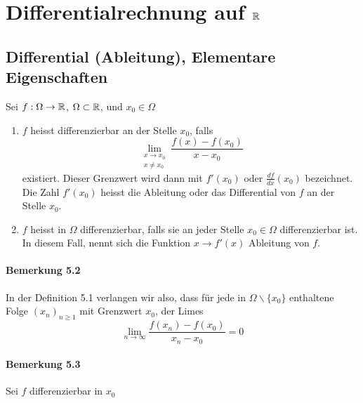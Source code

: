 \chapter{Differentialrechnung auf $\mathbb{R}$}
\section{Differential (Ableitung), Elementare Eigenschaften}
\begin{definition}{5.1}
Sei $f:\Omega\to\mathbb{R}$, $\Omega\subset\mathbb{R}$, und $x_0\in\Omega$
\begin{enumerate}
\item $f$ heisst differenzierbar an der Stelle $x_0$, falls
\[\mathop {\lim }\limits_{\begin{array}{*{20}{c}}
{x \to {x_0}}\\
{x\not  = {x_0}}
\end{array}} \frac{{f\left( x \right) - f\left( {{x_0}} \right)}}{{x - {x_0}}}\]
existiert. Dieser Grenzwert wird dann mit $f'\left( x_0\right)$ oder $\frac{df}{dx}\left( x_0\right)$ bezeichnet. Die Zahl $f'\left( x_0\right)$ heisst die Ableitung oder das Differential von $f$ an der Stelle $x_0$.
\item $f$ heisst in $\Omega$ differenzierbar, falls sie an jeder Stelle $x_0\in\Omega$ differenzierbar ist. In diesem Fall, nennt sich die Funktion $x\to f'(x)$ Ableitung von $f$.
\end{enumerate}
\end{definition}
\subsubsection*{Bemerkung 5.2}
In der Definition 5.1 verlangen wir also, dass für jede in $\Omega \backslash\{ x_0\}$ enthaltene Folge $\left( x_n\right)_{n\geq 1}$ mit Grenzwert $x_0$, der Limes
\[\mathop {\lim }\limits_{n \to \infty} \frac{{f\left( {x_n} \right) - f\left( {{x_0}} \right)}}{{x_n-x_0}} = 0\]
\subsubsection*{Bemerkung 5.3}
Sei $f$ differenzierbar in $x_0$
\begin{center}
\end{center}

